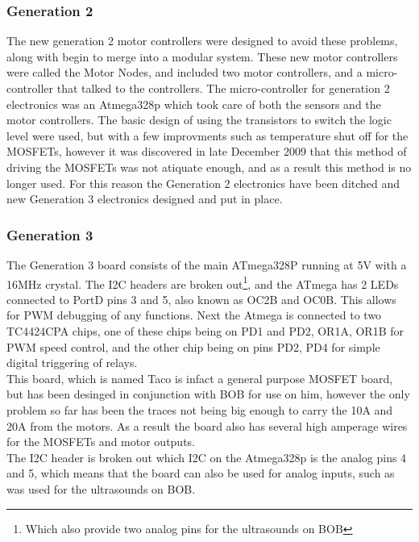 \documentclass{article}
\begin{document}
\subsubsection{Generation 2}
The new generation 2 motor controllers were designed to avoid these problems, along with begin to merge into a modular system. These new motor controllers were called the Motor Nodes, and included two motor controllers, and a micro-controller that talked to the controllers. The micro-controller for generation 2 electronics was an Atmega328p which took care of both the sensors and the motor controllers. The basic design of using the transistors to switch the logic level were used, but with a few improvments such as temperature shut off for the MOSFETs, however it was discovered in late December 2009 that this method of driving the MOSFETs was not atiquate enough, and as a result this method is no longer used. For this reason the Generation 2 electronics have been ditched and new Generation 3 electronics designed and put in place.\\
\subsubsection{Generation 3}
The Generation 3 board consists of the main ATmega328P running at 5V with a 16MHz crystal. The I2C headers are broken out\footnote{Which also provide two analog pins for the ultrasounds on BOB}, and the ATmega has 2 LEDs connected to PortD pins 3 and 5, also known as OC2B and OC0B. This allows for PWM debugging of any functions. Next the Atmega is connected to two TC4424CPA chips, one of these chips being on PD1 and PD2, OR1A, OR1B for PWM speed control, and the other chip being on pins PD2, PD4 for simple digital triggering of relays.\\
This board, which is named Taco is infact a general purpose MOSFET board, but has been desinged in conjunction with BOB for use on him, however the only problem so far has been the traces not being big enough to carry the 10A and 20A from the motors. As a result the board also has several high amperage wires for the MOSFETs and motor outputs.\\
The I2C header is broken out which I2C on the Atmega328p is the analog pins 4 and 5, which means that the board can also be used for analog inputs, such as was used for the ultrasounds on BOB.\\
\end{document}
